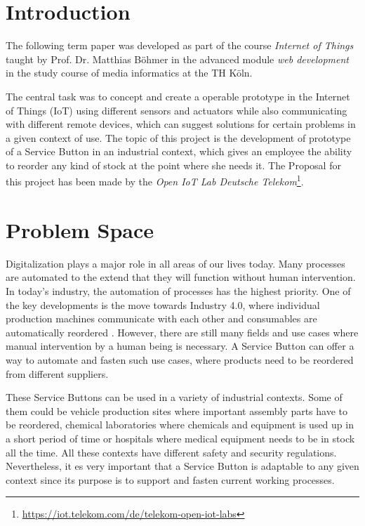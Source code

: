 \section{Introduction}
\label{sec:Intro}

The following term paper was developed as part of the course \textit{Internet of Things} taught by Prof. Dr. Matthias Böhmer in the advanced module \textit{web development} in the study course of media informatics at the TH Köln.

The central task was to concept and create a operable prototype in the Internet of Things (IoT) using different sensors and actuators while also communicating with different remote devices, which can suggest solutions for certain problems in a given context of use. The topic of this project is the development of prototype of a Service Button in an industrial context, which gives an employee the ability to reorder any kind of stock at the point where she needs it. The Proposal for this project has been made by the \textit{Open IoT Lab Deutsche Telekom}\footnote{\url{https://iot.telekom.com/de/telekom-open-iot-labs}}.

\section{Problem Space}
\label{sec:Problem-Space}

Digitalization plays a major role in all areas of our lives today. Many processes are automated to the extend that they will function without human intervention. In today's industry, the automation of processes has the highest priority.
One of the key developments is the move towards Industry 4.0, where individual production machines communicate with each other and consumables are automatically reordered \cite{Wollschlaeger:IoTIndustry4.0:2017}.
However, there are still many fields and use cases where manual intervention by a human being is necessary. A Service Button can offer a way to automate and fasten such use cases, where products need to be reordered from different suppliers.

These Service Buttons can be used in a variety of industrial contexts. Some of them could be vehicle production sites where important assembly parts have to be reordered, chemical laboratories where chemicals and equipment is used up in a short period of time or hospitals where medical equipment needs to be in stock all the time. All these contexts have different safety and security regulations. Nevertheless, it es very important that a Service Button is adaptable to any given context since its purpose is to support and fasten current working processes.

